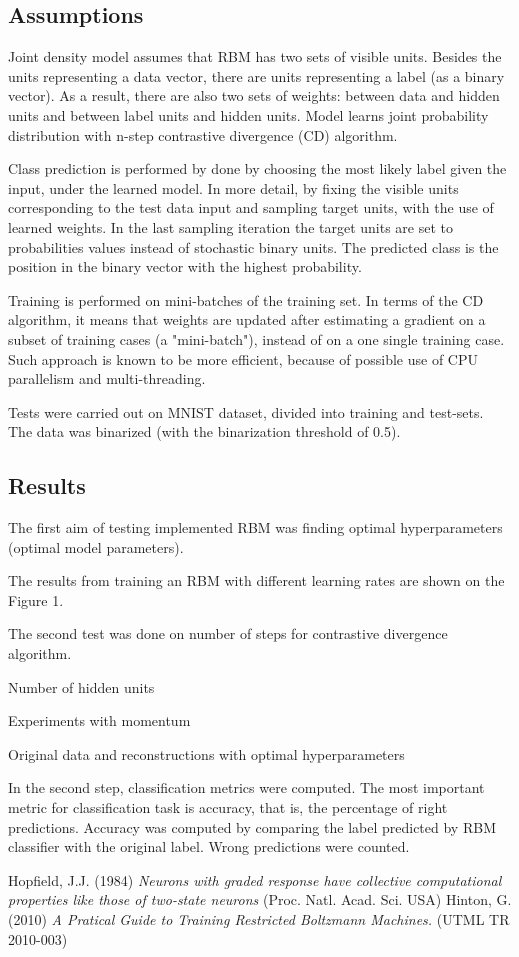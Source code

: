 \documentclass[a4paper]{scrartcl}
\begin{document}
\subsection{Assumptions}
Joint density model assumes that RBM has two sets of visible units. Besides the units representing a data vector, there are units representing a label (as a binary vector). As a result, there are also two sets of weights: between data and hidden units and between label units and hidden units. Model learns joint probability distribution with n-step contrastive divergence (CD) algorithm. 
\par Class prediction is performed by done by choosing the most likely label given the input, under the learned model. In more detail, by fixing the visible units corresponding to the test data input and sampling target units, with the use of learned weights. In the last sampling iteration the target units are set to probabilities values instead of stochastic binary units. The predicted class is the position in the binary vector with the highest probability.
\par Training is performed on mini-batches of the training set. In terms of the CD algorithm, it means that weights are updated after estimating a gradient on a subset of training cases (a "mini-batch"), instead of on a one single training case. Such approach is known to be more efficient, because of possible use of CPU parallelism and multi-threading.
\par Tests were carried out on MNIST dataset, divided into training and test-sets. The data was binarized (with the binarization threshold of 0.5). 

\subsection{Results}
The first aim of testing implemented RBM was finding optimal hyperparameters (optimal model parameters).
\par The results from training an RBM with different learning rates are shown on the Figure 1.
\par The second test was done on number of steps for contrastive divergence algorithm.
\par Number of hidden units 
\par Experiments with momentum
\par Original data and reconstructions with optimal hyperparameters
\par In the second step, classification metrics were computed. The most important metric for classification task is accuracy, that is, the percentage of right predictions. Accuracy was computed by comparing the label predicted by RBM classifier with the original label. Wrong predictions were counted.
\begin{thebibliography}{9}
    Hopfield, J.J. (1984) \emph{Neurons with graded response have collective computational properties like those of two-state neurons} (Proc. Natl. Acad. Sci. USA)
    Hinton, G. (2010) \emph{A Pratical Guide to Training Restricted Boltzmann Machines.} (UTML TR 2010-003)
   
\end{thebibliography}
\end{document}

